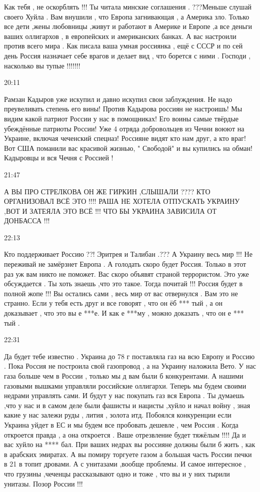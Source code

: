 {Как тебя , не оскорблять !!! Ты читала минские соглашения . ???Меньше слушай
своего Хуйла . Вам внушили , что Европа загнивающая , а Америка зло. Только все
дети ,жены любовницы ,живут и работают в Америке и Европе ,а все деньги ваших
оллигархов , в европейских и американских банках. А вас настроили против всего
мира . Как писала ваша умная россиянка , ещё с СССР и по сей день Россия
назначает себе врагов и делает вид , что борется с ними . Господи , насколько
вы тупые !!!!!!!

20:11

Рамзан Кадыров уже искупил и давно искупил свои заблуждения. Не надо
преувеливать степень его вины! Против Кадырова россиян не настроишь! Мы видим
какой патриот России у нас в помощниках! Его воины самые твёрдые убеждённые
патриоты России! Уже 4 отряда добровольцев из Чечни воюют на Украине, включая
чеченский спецназ! Россияне видят кто нам друг, а кто враг! Вот США поманили
вас красивой жизнью, " Свободой" и вы купились на обман! Кадыровцы и вся Чечня
с Россией !

21:47

А ВЫ ПРО СТРЕЛКОВА ОН ЖЕ ГИРКИН ,СЛЫШАЛИ ???? КТО ОРГАНИЗОВАЛ ВСЁ ЭТО !!!! РАША
НЕ ХОТЕЛА ОТПУСКАТЬ УКРАИНУ ,ВОТ И ЗАТЕЯЛА ЭТО ВСЁ !!! ЧТО БЫ УКРАИНА ЗАВИСИЛА
ОТ ДОНБАССА !!!

22:13

Кто поддерживает Россию ??! Эритрея и Талибан .??? А Украину весь мир !!! Не
переживай не замёрзнет Европа . А голодать скоро будет Россия. Только в этот
раз уж вам никто не поможет. Вас скоро объявят страной террористом. Это уже
обсуждается . Ты хоть знаешь ,что это такое. Тогда почитай !!! Россия будет в
полной жопе !!! Вы остались сами , весь мир от вас отвернулся . Вам это не
странно. Если у тебя есть друг и все говорят , что он ёб *** тый , а он
доказывает , что это вы е ***е. И как е ***му , можно доказать , что он е ***
тый .

22:31

Да будет тебе известно . Украина до 78 г поставляла газ на всю Европу и Россию
. Пока Россия не построила свой газопровод , а на Украину наложила Вето. У нас
газа больше чем в России , только мы д вам были б конкурентами. А нашими
газовыми вышками управляли российские оллигархи. Теперь мы будем своими недрами
управлять сами. И будут у нас покупать газ вся Европа . Ты думаешь ,что у нас и
в самом деле были фашисты и нацисты ,хуйло и начал войну , зная какие у нас
залежи руды , лития , золота итд. Побоялся конкуренции если Украина уйдет в ЕС
и мы будем все пробовать дешевле , чем Россия . Когда откроется правда , а она
откроется . Ваше отрезвление будет тяжёлым !!!! Да и вас хуйло на **** бал. При
ваших недрах вы россияне должны были б жить , как в арабских эмиратах. А вы
помиру торгуете газом а большая часть России печки в 21 в топит дровами. А с
унитазами ,вообще проблемы. И самое интересное , что грузины ,чеченцы
рассказывают одно и тоже , что вы и у них тырили унитазы. Позор России !!!

}
